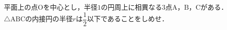 \documentclass[../../main.tex]{subfiles}
\begin{document}
平面上の点$\mathrm{O}$を中心とし，半径$1$の円周上に相異なる$3$点$\mathrm{A}$，$\mathrm{B}$，$\mathrm{C}$がある．
$\triangle{\mathrm{ABC}}$の内接円の半径$r$は$\dfrac{1}{2}$以下であることをしめせ．
\end{document}
